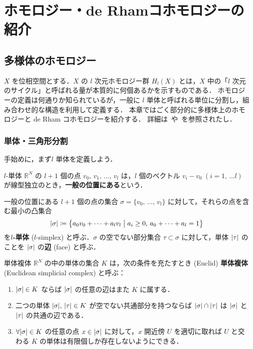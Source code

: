 \documentclass[geometry_main]{subfiles}
\begin{document}
\setcounter{chapter}{5}

\chapter{ホモロジー・de Rhamコホモロジーの紹介}

\section{多様体のホモロジー}

$X$ を位相空間とする．$X$ の $l$ 次元ホモロジー群 $H_l(X)$ とは，$X$ 中の「$l$ 次元のサイクル」と呼ばれる量が本質的に何個あるかを示すものである．
ホモロジーの定義は何通りか知られているが，一般に $l$ 単体と呼ばれる単位に分割し，組み合わせ的な構造を利用して定義する．
本章ではごく部分的に多様体上のホモロジーと de Rham コホモロジーを紹介する．
詳細は~\cite[第3章]{Morita}や~\cite[Chapter 17, 18]{Lee12}を参照されたし．

\subsection{単体・三角形分割}

手始めに，まず$l$ 単体を定義しよう．
\begin{mydef}[]{$l$-単体}
	$\mathbb{R}^N$ の $l+1$ 個の点 $v_0,\, v_1,\, \dots ,\, v_{l}$ は，$l$ 個のベクトル $v_i - v_0 \; (i = 1,\, \dots l)$ が線型独立のとき，\textbf{一般の位置にある}という．

	一般の位置にある $l+1$ 個の点の集合 $\sigma = \{v_0,\, \dots ,\, v_l\}$ に対して，それらの点を含む最小の凸集合
	\begin{align} 
		\abs{\sigma} \coloneqq \bigl\{ a_0 v_0 + \cdots + a_l v_l \bigm| a_i \ge 0,\, a_0 + \cdots + a_l = 1 \bigr\} 
	\end{align}
	を\textbf{$l$-単体} ($l$-simplex) と呼ぶ．$\sigma$ の空でない部分集合 $\tau \subset \sigma$ に対して，単体 $\abs{\tau}$ のことを $\abs{\sigma}$ の\textbf{辺} (face) と呼ぶ．
\end{mydef}

\begin{mydef}[label=def.unit]{単体複体} 
	$\mathbb{R}^N$ の中の単体の集合 $K$ は，次の条件を充たすとき (Euclid) \textbf{単体複体} (Euclidean simplicial complex) と呼ぶ：
	\begin{enumerate} 
		\item $\abs{\sigma} \in K$ ならば $\abs{\sigma}$ の任意の辺はまた $K$ に属する．
		\item 二つの単体 $\abs{\sigma},\, \abs{\tau} \in K$ が空でない共通部分を持つならば $\abs{\sigma} \cap \abs{\tau}$ は $\abs{\sigma}$ と $\abs{\tau}$ の共通の辺である．
		\item $\forall \abs{\sigma} \in K$ の任意の点 $x \in \abs{\sigma}$ に対して，$x$ 開近傍 $U$ を適切に取れば $U$ と交わる $K$ の単体は有限個しか存在しないようにできる．
	\end{enumerate}
\end{mydef}
\end{document}

